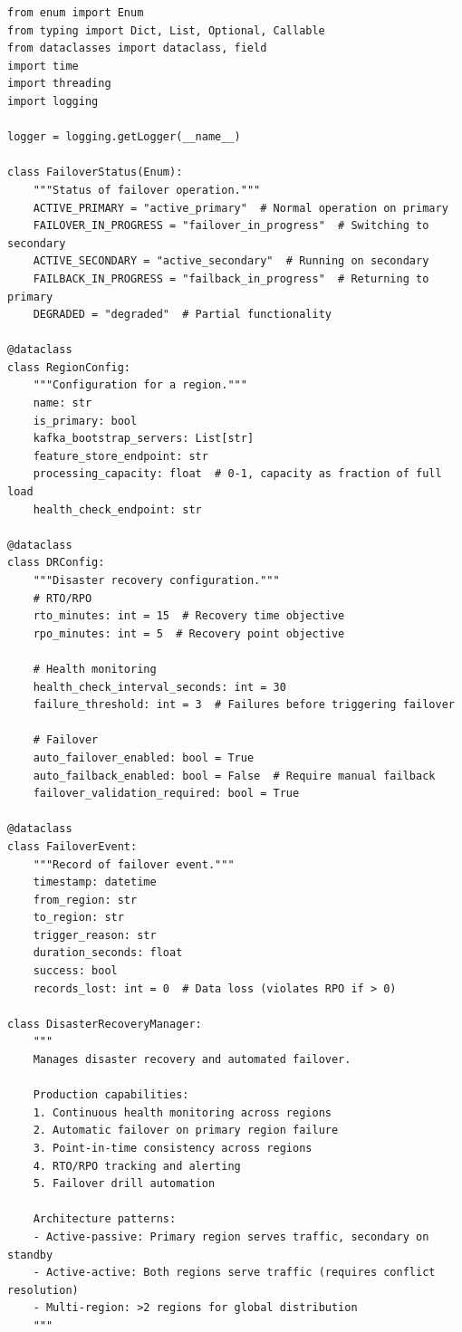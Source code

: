 \begin{lstlisting}[style=python, caption={Disaster Recovery Manager}]
from enum import Enum
from typing import Dict, List, Optional, Callable
from dataclasses import dataclass, field
import time
import threading
import logging

logger = logging.getLogger(__name__)

class FailoverStatus(Enum):
    """Status of failover operation."""
    ACTIVE_PRIMARY = "active_primary"  # Normal operation on primary
    FAILOVER_IN_PROGRESS = "failover_in_progress"  # Switching to secondary
    ACTIVE_SECONDARY = "active_secondary"  # Running on secondary
    FAILBACK_IN_PROGRESS = "failback_in_progress"  # Returning to primary
    DEGRADED = "degraded"  # Partial functionality

@dataclass
class RegionConfig:
    """Configuration for a region."""
    name: str
    is_primary: bool
    kafka_bootstrap_servers: List[str]
    feature_store_endpoint: str
    processing_capacity: float  # 0-1, capacity as fraction of full load
    health_check_endpoint: str

@dataclass
class DRConfig:
    """Disaster recovery configuration."""
    # RTO/RPO
    rto_minutes: int = 15  # Recovery time objective
    rpo_minutes: int = 5  # Recovery point objective

    # Health monitoring
    health_check_interval_seconds: int = 30
    failure_threshold: int = 3  # Failures before triggering failover

    # Failover
    auto_failover_enabled: bool = True
    auto_failback_enabled: bool = False  # Require manual failback
    failover_validation_required: bool = True

@dataclass
class FailoverEvent:
    """Record of failover event."""
    timestamp: datetime
    from_region: str
    to_region: str
    trigger_reason: str
    duration_seconds: float
    success: bool
    records_lost: int = 0  # Data loss (violates RPO if > 0)

class DisasterRecoveryManager:
    """
    Manages disaster recovery and automated failover.

    Production capabilities:
    1. Continuous health monitoring across regions
    2. Automatic failover on primary region failure
    3. Point-in-time consistency across regions
    4. RTO/RPO tracking and alerting
    5. Failover drill automation

    Architecture patterns:
    - Active-passive: Primary region serves traffic, secondary on standby
    - Active-active: Both regions serve traffic (requires conflict resolution)
    - Multi-region: >2 regions for global distribution
    """


\end{lstlisting}
